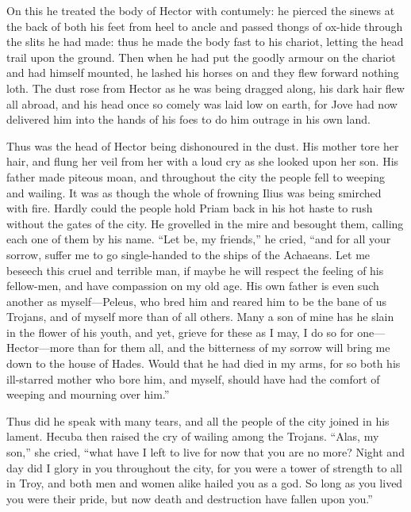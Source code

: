 On this he treated the body of Hector with contumely: he pierced the
sinews at the back of both his feet from heel to ancle and passed thongs
of ox-hide through the slits he had made: thus he made the body fast to
his chariot, letting the head trail upon the ground. Then when he had put
the goodly armour on the chariot and had himself mounted, he lashed his
horses on and they flew forward nothing loth. The dust rose from Hector as
he was being dragged along, his dark hair flew all abroad, and his head
once so comely was laid low on earth, for Jove had now delivered him into
the hands of his foes to do him outrage in his own land.

Thus was the head of Hector being dishonoured in the dust. His mother tore
her hair, and flung her veil from her with a loud cry as she looked upon
her son. His father made piteous moan, and throughout the city the people
fell to weeping and wailing. It was as though the whole of frowning Ilius
was being smirched with fire. Hardly could the people hold Priam back in
his hot haste to rush without the gates of the city. He grovelled in the
mire and besought them, calling each one of them by his name. “Let be, my
friends,” he cried, “and for all your sorrow, suffer me to go
single-handed to the ships of the Achaeans. Let me beseech this cruel and
terrible man, if maybe he will respect the feeling of his fellow-men, and
have compassion on my old age. His own father is even such another as
myself—Peleus, who bred him and reared him to be the bane of us
Trojans, and of myself more than of all others. Many a son of mine has he
slain in the flower of his youth, and yet, grieve for these as I may, I do
so for one—Hector—more than for them all, and the bitterness
of my sorrow will bring me down to the house of Hades. Would that he had
died in my arms, for so both his ill-starred mother who bore him, and
myself, should have had the comfort of weeping and mourning over him.”

Thus did he speak with many tears, and all the people of the city joined
in his lament. Hecuba then raised the cry of wailing among the Trojans.
“Alas, my son,” she cried, “what have I left to live for now that you are
no more? Night and day did I glory in you throughout the city, for you
were a tower of strength to all in Troy, and both men and women alike
hailed you as a god. So long as you lived you were their pride, but now
death and destruction have fallen upon you.”

